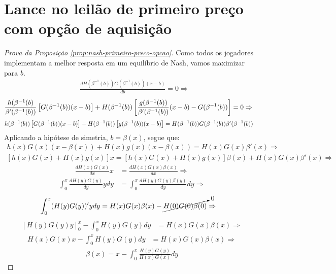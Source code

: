 \section{Lance no leilão de primeiro preço com opção de aquisição}
\begin{proof}[Prova da Proposição \ref{prop:nash-primeiro-preco-opcao}]
	Como todos os jogadores implementam a melhor resposta em um equilíbrio de Nash, vamos maximizar para $b$.
	\begin{align*}
		& \frac{d H(\beta^{-1}(b)) G(\beta^{-1}(b)) (x - b)}{db} = 0 \Rightarrow
	\end{align*}
	\begin{align*}
		\frac { h(\beta^{-1}(b)}{\beta'(\beta^{-1}(b))} \left[ G(\beta^{-1}(b))(x - b) \right] & + H(\beta^{-1}(b)) \left[ \frac{g(\beta^{-1}(b))}{\beta'(\beta^{-1}(b))}(x - b) - G(\beta^{-1}(b)) \right] = 0 \Rightarrow
	\end{align*}
	\begin{align*}
		h(\beta^{-1}(b)) \left[ G(\beta^{-1}(b))(x - b) \right] & + H(\beta^{-1}(b)) \left[ g(\beta^{-1}(b))(x - b) \right] = H(\beta^{-1}(b))G(\beta^{-1}(b))\beta'(\beta^{-1}(b))
	\end{align*}
	Aplicando a hipótese de simetria, $b = \beta(x)$, segue que:
	\begin{align*}
		h(x)G(x)(x-\beta(x)) + H(x)g(x)(x-\beta(x)) = H(x)G(x)\beta'(x) \Rightarrow
	\end{align*}
	\begin{align*}
		\left[ h(x)G(x) + H(x)g(x) \right]x = \left[ h(x)G(x) + H(x)g(x) \right]\beta(x) + H(x)G(x)\beta'(x) \Rightarrow
	\end{align*}
	\begin{align*}
		\frac {d H(x)G(x) }{dx} x & = \frac{d H(x)G(x)\beta(x)}{dx} \Rightarrow
	\end{align*}
	\begin{align*}
		\int_0^x \frac {d H(y)G(y) }{dy} ydy & = \int_0^x \frac{d H(y)G(y)\beta(y)}{dy}dy \Rightarrow
	\end{align*}
	\begin{align*}
    	\int_0^x (H(y)G(y))'ydy & = H(x)G(x)\beta(x) - \cancelto{0}{H(0)G(0)\beta(0)} \Rightarrow
    \end{align*}
	\begin{align*}
    	\left[ H(y)G(y)y \right]_0^x - \int_0^x H(y)G(y)dy & = H(x)G(x)\beta(x) \Rightarrow
    \end{align*}
	\begin{align*}
    	H(x)G(x)x - \int_0^x H(y)G(y)dy & = H(x)G(x)\beta(x) \Rightarrow
	\end{align*}
	\begin{align*}
    	\beta(x) = x - \int_0^x \frac{H(y)G(y)}{H(x)G(x)}dy
	\end{align*}
\end{proof}


